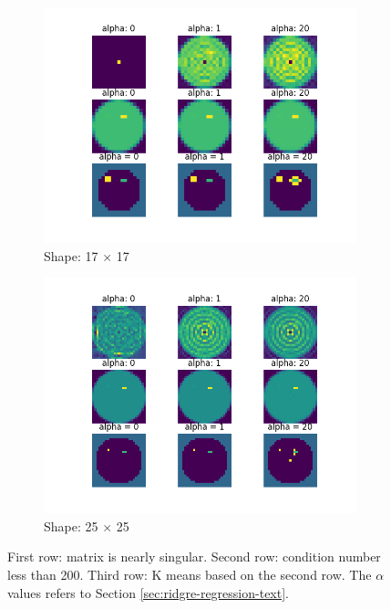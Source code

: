 \documentclass{article}
\begin{document}
\begin{figure}[H]
  \centering
  \begin{subfigure}[b]{0.45\linewidth}
    \includegraphics[width=\linewidth]{images/total-picture-17-condA1-3.1025624256157716e+16-condA2-7.2959506476769125.png}
    \caption{Shape: 17 $\times$ 17}
    \label{fig:sub1}
  \end{subfigure}
  \begin{subfigure}[b]{0.45\linewidth}
    \includegraphics[width=\linewidth]{images/total-picture-25-condA1-inf-condA2-49.46075340640841.png}
    \caption{Shape: 25 $\times$ 25}
    \label{fig:sub2}
  \end{subfigure}
  \caption{\small First row: matrix is nearly singular. Second row: condition number less than 200. Third row: K means based on the second row. The $\alpha$ values refers to Section \ref{sec:ridgre-regression-text}. }
  \label{fig:two-different-images-for-4.1}
\end{figure}
\end{document}

